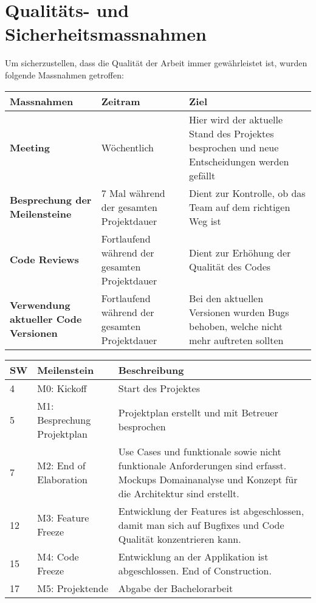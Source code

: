 \section{Qualitäts- und Sicherheitsmassnahmen}
Um sicherzustellen, dass die Qualität der Arbeit immer gewährleistet ist, wurden folgende Massnahmen getroffen:

\begin{center}
	\begin{tabular}{| m{3.5cm} | m{3.5cm} | m{3.5cm} |}
	\hline
	\textbf{Massnahmen} & \textbf{Zeitram} & \textbf{Ziel} \\
	\hline
	\textbf{Meeting} & Wöchentlich & Hier wird der aktuelle Stand des Projektes besprochen und neue Entscheidungen werden gefällt \\
	\hline
	\textbf{Besprechung der Meilensteine} & 7 Mal während der gesamten Projektdauer & Dient zur Kontrolle, ob das Team auf dem richtigen Weg ist \\
	\hline
	\textbf{Code Reviews} & Fortlaufend während der gesamten Projektdauer & Dient zur Erhöhung der Qualität des Codes \\
	\hline
	\textbf{Verwendung aktueller Code Versionen} & Fortlaufend während der gesamten Projektdauer & Bei den aktuellen Versionen wurden Bugs behoben, welche nicht mehr auftreten sollten \\
	\hline
	\end{tabular}
\end{center}

\begin{table}
\center
\begin{tabularx}{\textwidth}{p{} p{} p{}}
\toprule
SW & Meilenstein & Beschreibung \\ \midrule
4 & M0: Kickoff & Start des Projektes \\ 
5 & M1: Besprechung Projektplan & Projektplan erstellt und mit Betreuer \newline besprochen \\
7 & M2: End of Elaboration & Use Cases und funktionale sowie nicht \newline funktionale Anforderungen sind erfasst. \newline Mockups Domainanalyse und Konzept für \newline die Architektur sind erstellt. \\
12 & M3: Feature Freeze & Entwicklung der Features ist \newline abgeschlossen, damit man sich auf Bugfixes \newline und Code Qualität konzentrieren kann.\\
15 & M4: Code Freeze & Entwicklung an der Applikation ist \newline abgeschlossen. End of Construction.\\
17 & M5: Projektende & Abgabe der Bachelorarbeit \\ \bottomrule
\end{tabularx}

\end{table}


\newpage